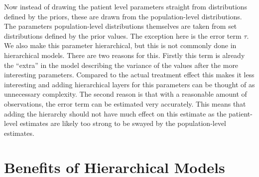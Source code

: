 \documentclass[12pt,a4paper,leqno]{report}
\theoremstyle{plain}
\theoremstyle{definition}
\theoremstyle{remark}
\begin{document}
Now instead of drawing the patient level parameters straight from distributions defined
by the priors, these are drawn from the population-level distributions. The parameters
population-level distributions themselves are taken from set distributions defined by
the prior values. The exception here is the error term \(\tau \). We also make this
parameter hierarchical, but this is not commonly done in hierarchical models. There are
two reasons for this. Firstly this term is already the ``extra'' in the model describing
the variance of the values after the more interesting parameters. Compared to the actual
treatment effect this makes it less interesting and adding hierarchical layers for this
parameters can be thought of as unnecessary complexity. The second reason is that with a
reasonable amount of observations, the error term can be estimated very accurately. This
means that adding the hierarchy should not have much effect on this estimate as the
patient-level estimates are likely too strong to be swayed by the population-level
estimates.


\section{Benefits of Hierarchical Models}
\end{document}
